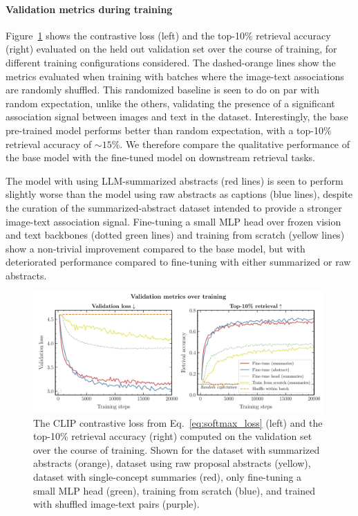 \documentclass[10pt]{article} %
\begin{document}
\paragraph*{Validation metrics during training}

Figure~\ref{fig:retrieval_acc} shows the contrastive loss (left) and the top-10\% retrieval accuracy (right) evaluated on the held out validation set over the course of training, for different training configurations considered.
%
The dashed-orange lines show the metrics evaluated when training with batches where the image-text associations are randomly shuffled.
%
This randomized baseline is seen to do on par with random expectation, unlike the others, validating the presence of a significant association signal between images and text in the dataset.
%
Interestingly, the base pre-trained model performs better than random expectation, with a top-10\% retrieval accuracy of $\sim 15\%$.
%
We therefore compare the qualitative performance of the base model with the fine-tuned model on downstream retrieval tasks.

The model with using LLM-summarized abstracts (red lines) is seen to perform slightly worse than the model using raw abstracts as captions (blue lines), despite the curation of the summarized-abstract dataset intended to provide a stronger image-text association signal.
%
Fine-tuning a small MLP head over frozen vision and text backbones (dotted green lines) and training from scratch (yellow lines) show a non-trivial improvement compared to the base model, but with deteriorated performance compared to fine-tuning with either summarized or raw abstracts.

\begin{figure}[!h]
\includegraphics[width=0.99\textwidth]{plots/val_metrics.pdf}
\caption{The CLIP contrastive loss from Eq.~\ref{eq:softmax_loss} (left) and the top-10\% retrieval accuracy (right) computed on the validation set over the course of training. Shown for the dataset with summarized abstracts (orange), dataset using raw proposal abstracts (yellow), dataset with single-concept summaries (red), only fine-tuning a small MLP head (green), training from scratch (blue), and trained with shuffled image-text pairs (purple).}
\label{fig:retrieval_acc}
\end{figure}
\end{document}
